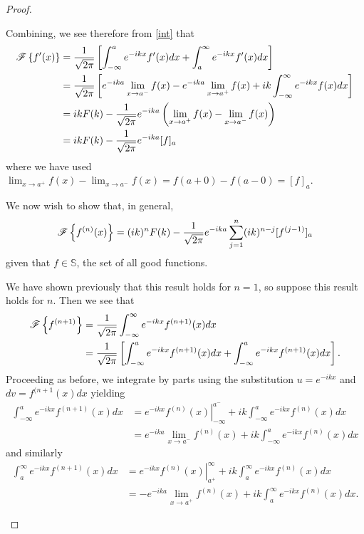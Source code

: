 \begin{proof}
\begin{enumerate}
      Combining, we see therefore from \eqref{int} that
      \begin{align*}
        \mathscr{F}\left\{ {f'(x)} \right\} &= \frac{1}{\sqrt{2\pi}} \left[\int_{-\infty}^{a} e^{-ikx} f'(x) dx + \int_{a}^{\infty} e^{-ikx} f'(x) dx \right] \\
        &= \frac{1}{\sqrt{2\pi}} \left[
          e^{-ika} \lim_{x\to a^{-}}f(x)
          -e^{-ika} \lim_{x\to a^{+}}f(x)  + ik \int_{-\infty}^\infty e^{-ikx}f(x) dx
        \right] \\
        &= ik F(k) - \frac{1}{\sqrt{2\pi}}e^{-ika}\left( \lim_{x\to a^+} f(x) - \lim_{x\to a^{-}} f(x)\right) \\
        &= ik F(k) - \frac{1}{\sqrt{2\pi}}e^{-ika} [f]_a
      \end{align*}
      where we have used $\lim_{x\to a^+} f(x) - \lim_{x\to a^{-}} f(x) = f(a+0) - f(a-0) = [f]_a$.

      We now wish to show that, in general,
      \begin{align}\label{ind_four}
        \mathscr{F}\left\{ {f^{(n)}(x)} \right\} = (ik)^n F(k) - \frac{1}{\sqrt{2\pi}}e^{-ika}\sum_{j=1}^{n} (ik)^{n-j} [f^{(j-1)}]_a
      \end{align}
      given that $f\in \mathbb{S}$, the set of all good functions.

      We have shown previously that this result holds for $n=1$, so suppose this result
      holds for $n$.
      Then we see that
      \begin{align*}
        \mathscr{F}\left\{ {f^{(n+1)}} \right\} &= \frac{1}{\sqrt{2\pi}}\int_{-\infty}^{\infty}e^{-ikx}f^{(n+1)}(x)dx \\
        &= \frac{1}{\sqrt{2\pi}}\left[\int_{-\infty}^{a}e^{-ikx}f^{(n+1)}(x)dx + \int_{-\infty}^{a}e^{-ikx}f^{(n+1)}(x)dx\right].
      \end{align*}
      Proceeding as before, we integrate by parts using the substitution $u = e^{-ikx}$ and $dv = f^{(n+1}(x)dx$ yielding
      \begin{align*}
        \int_{-\infty}^{a}e^{-ikx}f^{(n+1)}(x)dx &= \left. e^{-ikx}f^{(n)}(x)\right\rvert_{-\infty}^{a^-} + ik \int_{-\infty}^{a} e^{-ikx} f^{(n)}(x)dx \\
        &= e^{-ika}\lim_{x\to a^{-}}f^{(n)}(x) + ik \int_{-\infty}^{a} e^{-ikx} f^{(n)}(x)dx
      \end{align*}
      and similarly
      \begin{align*}
        \int_{a}^{\infty}e^{-ikx}f^{(n+1)}(x)dx &= \left. e^{-ikx}f^{(n)}(x)\right\rvert_{a^+}^{\infty} + ik \int_{a}^{\infty} e^{-ikx} f^{(n)}(x)dx \\
        &= -e^{-ika}\lim_{x\to a^{+}}f^{(n)}(x) + ik \int_{a}^{\infty} e^{-ikx} f^{(n)}(x)dx.
      \end{align*}


\end{enumerate}
\end{proof}
